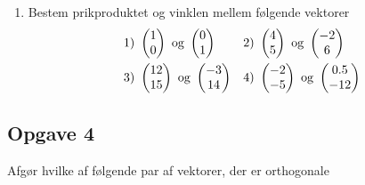 \begin{enumerate}[label=\roman*)]
\item Bestem prikproduktet og vinklen mellem følgende vektorer
\begin{align*}
&1) \ \begin{pmatrix}1 \\ 0\end{pmatrix} \textnormal{ og } \begin{pmatrix}0 \\ 1\end{pmatrix}    &&2) \  \begin{pmatrix} 4 \\  5\end{pmatrix} \textnormal{ og } \begin{pmatrix} -2  \\ 6\end{pmatrix}    \\
&3) \ \begin{pmatrix}12 \\ 15\end{pmatrix} \textnormal{ og } \begin{pmatrix}-3 \\ 14 \end{pmatrix}   &&4) \ \begin{pmatrix} -2 \\ -5\end{pmatrix} \textnormal{ og } \begin{pmatrix} 0.5 \\ -12 \end{pmatrix}     \\
\end{align*}
\end{enumerate}

\subsection*{Opgave 4}

Afgør hvilke af følgende par af vektorer, der er orthogonale

